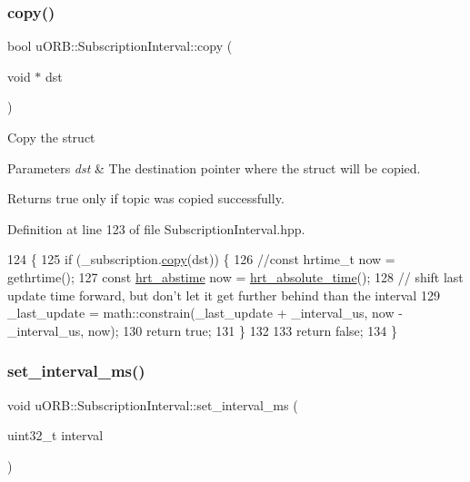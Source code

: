 \subsubsection{\texorpdfstring{copy()}{copy()}}
{\footnotesize\ttfamily bool u\+O\+R\+B\+::\+Subscription\+Interval\+::copy (\begin{DoxyParamCaption}\item[{void $\ast$}]{dst }\end{DoxyParamCaption})\hspace{0.3cm}{\ttfamily [inline]}}

Copy the struct 
\begin{DoxyParams}{Parameters}
{\em dst} & The destination pointer where the struct will be copied. \\
\hline
\end{DoxyParams}
\begin{DoxyReturn}{Returns}
true only if topic was copied successfully. 
\end{DoxyReturn}


Definition at line 123 of file Subscription\+Interval.\+hpp.


\begin{DoxyCode}
124     \{
125         \textcolor{keywordflow}{if} (\_subscription.\hyperlink{classuORB_1_1Subscription_a17a37eb5624b409379db434400de4582}{copy}(dst)) \{
126             \textcolor{comment}{//const hrtime\_t now = gethrtime();}
127             \textcolor{keyword}{const} \hyperlink{drv__hrt_8h_a9f8bbf0e883115e04a457a268533a87c}{hrt\_abstime} now = \hyperlink{drv__hrt_8h_a91f4291796ed7fbe544dc22ee5288367}{hrt\_absolute\_time}();
128             \textcolor{comment}{// shift last update time forward, but don't let it get further behind than the interval}
129             \_last\_update = math::constrain(\_last\_update + \_interval\_us, now - \_interval\_us, now);
130             \textcolor{keywordflow}{return} \textcolor{keyword}{true};
131         \}
132 
133         \textcolor{keywordflow}{return} \textcolor{keyword}{false};
134     \}
\end{DoxyCode}
\mbox{\label{classuORB_1_1SubscriptionInterval_a12e68cbb4d69d82ec586aa2bbc8e9672}} 
\subsubsection{\texorpdfstring{set\+\_\+interval\+\_\+ms()}{set\_interval\_ms()}}
{\footnotesize\ttfamily void u\+O\+R\+B\+::\+Subscription\+Interval\+::set\+\_\+interval\+\_\+ms (\begin{DoxyParamCaption}\item[{uint32\+\_\+t}]{interval }\end{DoxyParamCaption})\hspace{0.3cm}{\ttfamily [inline]}}

